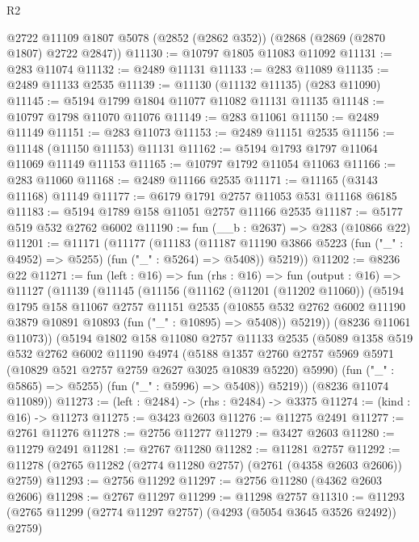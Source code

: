 \begin{lexlean}{R2}
\begin{coremodule}
    @2722
    @11109
    @1807
    @5078
    (@2852 (@2862 @352))
    (@2868 (@2869 (@2870 @1807) @2722 @2847))
@11130 := @10797 @1805 @11083 @11092
@11131 := @283 @11074
@11132 := @2489 @11131
@11133 := @283 @11089
@11135 := @2489 @11133 @2535
@11139 := @11130 (@11132 @11135) (@283 @11090)
@11145 := @5194 @1799 @1804 @11077 @11082 @11131 @11135
@11148 := @10797 @1798 @11070 @11076
@11149 := @283 @11061
@11150 := @2489 @11149
@11151 := @283 @11073
@11153 := @2489 @11151 @2535
@11156 := @11148 (@11150 @11153) @11131
@11162 := @5194 @1793 @1797 @11064 @11069 @11149 @11153
@11165 := @10797 @1792 @11054 @11063
@11166 := @283 @11060
@11168 := @2489 @11166 @2535
@11171 := @11165 (@3143 @11168) @11149
@11177 := @6179 @1791 @2757 @11053 @531 @11168 @6185
@11183 := @5194 @1789 @158 @11051 @2757 @11166 @2535
@11187 := @5177 @519 @532 @2762 @6002
@11190 := fun (__b : @2637) => @283 (@10866 @22)
@11201 := @11171
    (@11177
      (@11183
        (@11187 @11190 @3866 @5223 (fun ("_" : @4952) => @5255) (fun ("_" : @5264) => @5408))
        @5219))
@11202 := @8236 @22
@11271 := fun (left : @16) =>
  fun (rhs : @16) =>
  fun (output : @16) =>
  @11127
    (@11139
      (@11145
        (@11156
          (@11162
            (@11201 (@11202 @11060))
            (@5194
              @1795
              @158
              @11067
              @2757
              @11151
              @2535
              (@10855 @532 @2762 @6002 @11190 @3879 @10891 @10893 (fun ("_" : @10895) => @5408))
              @5219))
          (@8236 @11061 @11073))
        (@5194
          @1802
          @158
          @11080
          @2757
          @11133
          @2535
          (@5089
            @1358
            @519
            @532
            @2762
            @6002
            @11190
            @4974
            (@5188
              @1357
              @2760
              @2757
              @5969
              @5971
              (@10829 @521 @2757 @2759 @2627 @3025 @10839 @5220)
              @5990)
            (fun ("_" : @5865) => @5255)
            (fun ("_" : @5996) => @5408))
          @5219))
      (@8236 @11074 @11089))
@11273 := (left : @2484) -> (rhs : @2484) -> @3375
@11274 := (kind : @16) -> @11273
@11275 := @3423 @2603
@11276 := @11275 @2491
@11277 := @2761 @11276
@11278 := @2756 @11277
@11279 := @3427 @2603
@11280 := @11279 @2491
@11281 := @2767 @11280
@11282 := @11281 @2757
@11292 := @11278 (@2765 @11282 (@2774 @11280 @2757) (@2761 (@4358 @2603 @2606)) @2759)
@11293 := @2756 @11292
@11297 := @2756 @11280 (@4362 @2603 @2606)
@11298 := @2767 @11297
@11299 := @11298 @2757
@11310 := @11293 (@2765 @11299 (@2774 @11297 @2757) (@4293 (@5054 @3645 @3526 @2492)) @2759)

\end{coremodule}
\end{lexlean}
